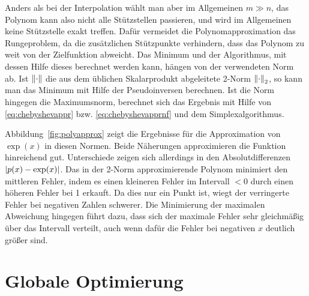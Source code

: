 Anders als bei der Interpolation wählt man aber im Allgemeinen $m\gg
n$, das Polynom kann also nicht alle Stützstellen passieren, und wird
im Allgemeinen keine Stützstelle exakt treffen. Dafür vermeidet die
Polynomapproximation das Rungeproblem, da die zusätzlichen Stützpunkte
verhindern, dass das Polynom zu weit von der Zielfunktion abweicht.
Das Minimum und der Algorithmus, mit dessen Hilfe dieses berechnet
werden kann, hängen von der verwendeten Norm ab. Ist $\left\lVert{\cdot}\right\rVert$
die aus dem üblichen Skalarprodukt abgeleitete 2-Norm $\left\lVert{\cdot}\right\rVert_2$,
so kann man das Minimum mit Hilfe der Pseudoinversen berechnen. Ist
die Norm hingegen die Maximumsnorm, berechnet sich das Ergebnis mit
Hilfe von \eqref{eq:chebyshevappr} bzw. \eqref{eq:chebyshevapprnf} und
dem Simplexalgorithmus.

Abbildung~\ref{fig:polyapprox} zeigt die Ergebnisse für die
Approximation von $\exp(x)$ in diesen Normen. Beide Näherungen
approximieren die Funktion hinreichend gut. Unterschiede zeigen sich
allerdings in den Absolutdifferenzen $\left\lvert{p(x) - \exp(x)}\right\rvert$. Das in der
2-Norm approximierende Polynom minimiert den mittleren Fehler, indem
es einen kleineren Fehler im Intervall $<0$ durch einen höheren Fehler
bei 1 erkauft. Da dies nur ein Punkt ist, wiegt der verringerte Fehler
bei negativen Zahlen schwerer. Die Minimierung der maximalen
Abweichung hingegen führt dazu, dass sich der maximale Fehler sehr
gleichmäßig über das Intervall verteilt, auch wenn dafür die Fehler bei
negativen $x$ deutlich größer sind.

\afterpage{\raggedbottom
   \clearpage }


\section{Globale Optimierung}


